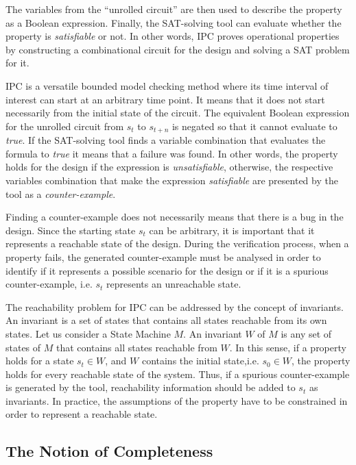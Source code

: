 The variables from the “unrolled circuit” are then used to describe the property as a Boolean expression. Finally, the SAT-solving tool can evaluate whether the property is \textit{satisfiable} or not. In other words, IPC proves operational properties by constructing a combinational circuit for the design and solving a SAT problem for it. 

IPC is a versatile bounded model checking method where its time interval of interest can start at an arbitrary time point. It means that it does not start necessarily from the initial state of the circuit. The equivalent Boolean expression for the unrolled circuit from $s_t$ to $s_{t+n}$ is negated so that it cannot evaluate to \textit{true}. If the SAT-solving tool finds a variable combination that evaluates the formula to \textit{true} it means that a failure was found. In other words, the property holds for the design if the expression is \textit{unsatisfiable}, otherwise, the respective variables combination that make the expression \textit{satisfiable} are presented by the tool as a \textit{counter-example}.

Finding a counter-example does not necessarily means that there is a bug in the design. Since the starting state $s_t$ can be arbitrary, it is important that it represents a reachable state of the design. During the verification process, when a property fails, the generated counter-example must be analysed in order to identify if it represents a possible scenario for the design or if it is a spurious counter-example, i.e. $s_t$ represents an unreachable state.

The reachability problem for IPC can be addressed by the concept of invariants. An invariant is a set of states that contains all states reachable from its own states. Let us consider a State Machine $M$. An invariant $W$ of $M$ is any set of states of $M$ that contains all states reachable from $W$. In this sense, if a property holds for a state $s_t \in W$, and $W$  contains the initial state,i.e. $s_0 \in W$, the property holds for every reachable state of the system. Thus, if a spurious counter-example is generated by the tool, reachability information should be added to $s_t$ as invariants. In practice, the assumptions of the property have to be constrained in order to represent a reachable state. 

\subsection{The Notion of Completeness}
\label{subsection:notion-completeness}

